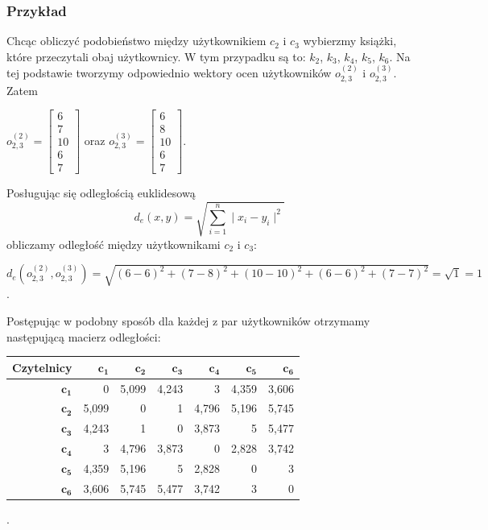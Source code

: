 \documentclass[12pt,a4paper]{report}
\begin{document}
\subsubsection{Przykład}
Chcąc obliczyć podobieństwo między użytkownikiem $c_2$ i $c_3$ wybierzmy książki, które przeczytali obaj użytkownicy. W tym przypadku są to: $k_2$, $k_3$, $k_4$, $k_5$, $k_6$. Na tej podstawie tworzymy odpowiednio wektory ocen użytkowników $o_{2,3} ^{(2)}$ i $o_{2,3}^{(3)}$. 
\\Zatem
\begin{center}
$o_{2,3} ^{(2)}= \left[
        \begin{array}{c}
         6 \\
         7 \\
         10 \\
         6 \\
         7
         \end{array}
      \right]$ oraz $o_{2,3}^{(3)} = \left[
        \begin{array}{c}
         6 \\
         8 \\
         10 \\
         6 \\
         7
         \end{array}
      \right]$.
\end{center}
Posługując się odległością euklidesową
$$d_{e}(x,y) = \sqrt{\sum_{i=1}^n \mid x_{i} - y_{i} \mid ^2 }$$
obliczamy odległość między użytkownikami $c_2$ i $c_3$: 
\begin{center}
$d_{e}(o_{2,3}^{(2)},o_{2,3}^{(3)}) = \sqrt{(6-6)^2 + (7-8)^2 + (10-10)^2 + (6-6)^2 + (7-7)^2} = \sqrt{1} = 1$.
\end{center}
Postępując w podobny sposób dla każdej z par użytkowników otrzymamy następującą macierz odległości:
\begin{center}
\begin{tabular}{|r|r|r|r|r|r|r|} \hline
\textbf{Czytelnicy} & $\mathbf{c_1}$ & $\mathbf{c_2}$ & $\mathbf{c_3}$ & $\mathbf{c_4}$ & $\mathbf{c_5}$ & $\mathbf{c_6}$\\
\hline
$\mathbf{c_1}$ & 0 & 5,099 & 4,243 & 3 & 4,359 & 3,606 \\
\hline
$\mathbf{c_2}$ & 5,099 & 0 & 1 & 4,796 & 5,196 & 5,745\\
\hline
$\mathbf{c_3}$ & 4,243 & 1 & 0 & 3,873 & 5 & 5,477\\
\hline
$\mathbf{c_4}$ & 3 & 4,796 & 3,873 & 0 & 2,828 & 3,742 \\
\hline 
$\mathbf{c_5}$ & 4,359 & 5,196 & 5 & 2,828 & 0 & 3 \\
\hline 
$\mathbf{c_6}$ & 3,606 & 5,745 & 5,477 & 3,742 & 3 & 0 \\
\hline 
\end{tabular}.
\end{center}
\end{document}
